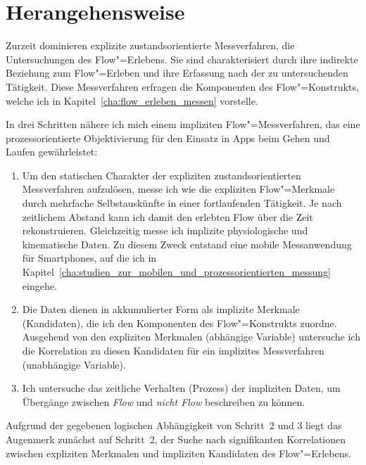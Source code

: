 

\section{Herangehensweise} 

\label{sec:herangehensweise}

Zurzeit dominieren explizite zustandsorientierte Messverfahren, die Untersuchungen des Flow"=Erlebens. Sie sind charakterisiert durch ihre indirekte Beziehung zum Flow"=Erleben und ihre Erfassung nach der zu untersuchenden Tätigkeit. Diese Messverfahren erfragen die Komponenten des Flow"=Konstrukts, welche ich in Kapitel~\ref{cha:flow_erleben_messen} vorstelle. 

In drei Schritten nähere ich mich einem impliziten Flow"=Messverfahren, das eine prozessorientierte Objektivierung für den Einsatz in Apps beim Gehen und Laufen gewährleistet: 
\begin{enumerate}
	\item Um den statischen Charakter der expliziten zustandsorientierten Messverfahren aufzulösen, messe ich wie \citet{Reinhardt2006, Schuler2009} die expliziten Flow"=Merkmale durch mehrfache Selbstauskünfte in einer fortlaufenden Tätigkeit. Je nach zeitlichem Abstand kann ich damit den erlebten Flow über die Zeit rekonstruieren. Gleichzeitig messe ich implizite physiologische und kinematische Daten. Zu diesem Zweck entstand eine mobile Messanwendung für Smartphones, auf die ich in Kapitel~\ref{cha:studien_zur_mobilen_und_prozessorientierten_messung} eingehe.
	
	\item Die Daten dienen in akkumulierter Form als implizite Merkmale (Kandidaten), die ich den Komponenten des Flow"=Konstrukts zuordne. Ausgehend von den expliziten Merkmalen (abhängige Variable) untersuche ich die Korrelation zu diesen Kandidaten für ein implizites Messverfahren (unabhängige Variable).
	
	\item Ich untersuche das zeitliche Verhalten (Prozess) der impliziten Daten, um Übergänge zwischen \emph{Flow} und \emph{nicht Flow} beschreiben zu können. 
\end{enumerate}

Aufgrund der gegebenen logischen Abhängigkeit von Schritt~2 und 3 liegt das Augenmerk zunächst auf Schritt~2, der Suche nach signifikanten Korrelationen zwischen expliziten Merkmalen und impliziten Kandidaten des Flow"=Erlebens. 

